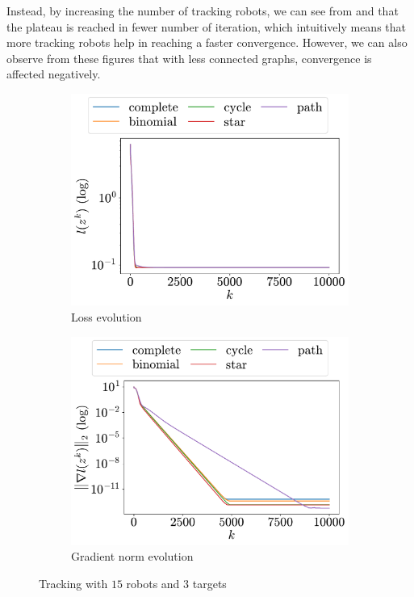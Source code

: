 \documentclass[a4paper,11pt,oneside]{book}
\begin{document}
Instead, by increasing the number of tracking robots, we can see from  and  that the plateau is reached in fewer number of iteration, which intuitively means that more tracking robots help in reaching a faster convergence. However, we can also observe from these figures that with less connected graphs, convergence is affected negatively.

\begin{figure}[H]
      \centering
      \begin{subfigure}[t]{0.46\linewidth}
            \centering
            \includegraphics[width=\linewidth]{./figs/tracking/15_3_2/loss.pdf} 
            \caption{Loss evolution}
      \end{subfigure}
      \hfill
      \begin{subfigure}[t]{0.46\linewidth}
            \centering
            \includegraphics[width=\linewidth]{./figs/tracking/15_3_2/gradient.pdf} 
            \caption{Gradient norm evolution}
      \end{subfigure}
      \caption{Tracking with $15$ robots and $3$ targets}
      \label{fig:tracking_15_3}
\end{figure}
\end{document}
